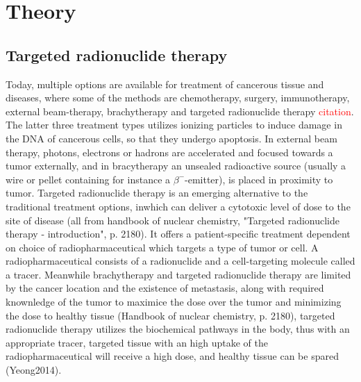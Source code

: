 \chapter{Theory}

\section{Targeted radionuclide therapy}

Today, multiple options are available for treatment of cancerous tissue and diseases, where some of the methods are chemotherapy, surgery, immunotherapy, external beam-therapy, brachytherapy and targeted radionuclide therapy \textcolor{red}{citation}. The latter three treatment types utilizes ionizing particles to induce damage in the DNA of cancerous cells, so that they undergo apoptosis. In external beam therapy, photons, electrons or hadrons are accelerated and focused towards a tumor externally, and in bracytherapy an unsealed radioactive source (usually a wire or pellet containing for instance a $\beta^-$-emitter), is placed in proximity to tumor. Targeted radionuclide therapy is an emerging alternative to the traditional treatment options, inwhich can deliver a cytotoxic level of dose to the site of disease (all from handbook of nuclear chemistry, "Targeted radionuclide therapy - introduction", p. 2180). It offers a patient-specific treatment dependent on choice of radiopharmaceutical which targets a type of tumor or cell. A radiopharmaceutical consists of a radionuclide and a cell-targeting molecule called a tracer.  Meanwhile brachytherapy and targeted radionuclide therapy are limited by the cancer location and the existence of metastasis, along with required knownledge of the tumor to maximice the dose over the tumor and minimizing the dose to healthy tissue (Handbook of nuclear chemistry, p. 2180), targeted radionuclide therapy utilizes the biochemical pathways in the body, thus with an appropriate tracer, targeted tissue with an high uptake of the radiopharmaceutical will receive a high dose, and healthy tissue can be spared (Yeong2014).\\ 

\noindent 



